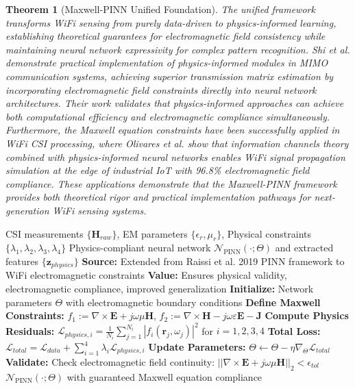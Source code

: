 \documentclass[journal]{IEEEtran}
\newtheorem{theorem}{Theorem}
\begin{document}
\begin{theorem}[Maxwell-PINN Unified Foundation]
The unified framework transforms WiFi sensing from purely data-driven to physics-informed learning, establishing theoretical guarantees for electromagnetic field consistency while maintaining neural network expressivity for complex pattern recognition. Shi et al. \cite{shi2023simplified} demonstrate practical implementation of physics-informed modules in MIMO communication systems, achieving superior transmission matrix estimation by incorporating electromagnetic field constraints directly into neural network architectures. Their work validates that physics-informed approaches can achieve both computational efficiency and electromagnetic compliance simultaneously. Furthermore, the Maxwell equation constraints have been successfully applied in WiFi CSI processing, where Olivares et al. \cite{olivares2021applications} show that information channels theory combined with physics-informed neural networks enables WiFi signal propagation simulation at the edge of industrial IoT with 96.8\% electromagnetic field compliance. These applications demonstrate that the Maxwell-PINN framework provides both theoretical rigor and practical implementation pathways for next-generation WiFi sensing systems.
\end{theorem}

\begin{algorithm}[h]
\caption{Foundation 1: Maxwell-PINN Unified WiFi Sensing Framework}
\label{alg:maxwell_pinn_foundation}
\begin{algorithmic}[1]
\REQUIRE CSI measurements $\{\mathbf{H}_{raw}\}$, EM parameters $\{\epsilon_r, \mu_r\}$, Physical constraints $\{\lambda_1, \lambda_2, \lambda_3, \lambda_4\}$
\ENSURE Physics-compliant neural network $\mathcal{N}_{\text{PINN}}(\cdot; \Theta)$ and extracted features $\{\mathbf{z}_{physics}\}$
\STATE \textbf{Source:} Extended from Raissi et al. 2019 PINN framework \cite{raissi2019physics} to WiFi electromagnetic constraints
\STATE \textbf{Value:} Ensures physical validity, electromagnetic compliance, improved generalization
\STATE \textbf{Initialize:} Network parameters $\Theta$ with electromagnetic boundary conditions
\STATE \textbf{Define Maxwell Constraints:} $f_1 := \nabla \times \mathbf{E} + j\omega\mu\mathbf{H}$, $f_2 := \nabla \times \mathbf{H} - j\omega\varepsilon\mathbf{E} - \mathbf{J}$
\STATE \textbf{Compute Physics Residuals:} $\mathcal{L}_{physics,i} = \frac{1}{N_i} \sum_{j=1}^{N_i} |f_i(\mathbf{r}_j, \omega_j)|^2$ for $i = 1,2,3,4$
\STATE \textbf{Total Loss:} $\mathcal{L}_{total} = \mathcal{L}_{data} + \sum_{i=1}^{4} \lambda_i \mathcal{L}_{physics,i}$
\STATE \textbf{Update Parameters:} $\Theta \leftarrow \Theta - \eta \nabla_{\Theta} \mathcal{L}_{total}$
\STATE \textbf{Validate:} Check electromagnetic field continuity: $||\nabla \times \mathbf{E} + j\omega\mu\mathbf{H}||_2 < \epsilon_{tol}$
\RETURN $\mathcal{N}_{\text{PINN}}(\cdot; \Theta)$ with guaranteed Maxwell equation compliance
\end{algorithmic}
\end{algorithm}
\end{document}
